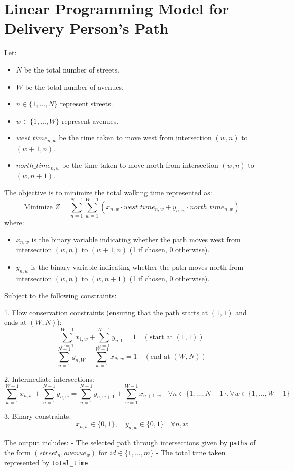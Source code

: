 \documentclass{article}
\begin{document}
\section*{Linear Programming Model for Delivery Person's Path}

Let:
\begin{itemize}
    \item \( N \) be the total number of streets.
    \item \( W \) be the total number of avenues.
    \item \( n \in \{1, \ldots, N\} \) represent streets.
    \item \( w \in \{1, \ldots, W\} \) represent avenues.
    \item \( west\_time_{n,w} \) be the time taken to move west from intersection \((w,n)\) to \((w+1,n)\).
    \item \( north\_time_{n,w} \) be the time taken to move north from intersection \((w,n)\) to \((w,n+1)\).
\end{itemize}

The objective is to minimize the total walking time represented as:
\[
\text{Minimize } Z = \sum_{n=1}^{N-1} \sum_{w=1}^{W-1} (x_{n,w} \cdot west\_time_{n,w} + y_{n,w} \cdot north\_time_{n,w}) 
\]
where:
\begin{itemize}
    \item \( x_{n,w} \) is the binary variable indicating whether the path moves west from intersection \((w,n)\) to \((w+1,n)\) (1 if chosen, 0 otherwise).
    \item \( y_{n,w} \) is the binary variable indicating whether the path moves north from intersection \((w,n)\) to \((w,n+1)\) (1 if chosen, 0 otherwise).
\end{itemize}

Subject to the following constraints:

1. Flow conservation constraints (ensuring that the path starts at \((1,1)\) and ends at \((W,N)\)):
   \[
   \sum_{w=1}^{W-1} x_{1,w} + \sum_{n=1}^{N-1} y_{n,1} = 1 \quad (\text{start at } (1,1))
   \]
   \[
   \sum_{n=1}^{N-1} y_{n,W} + \sum_{w=1}^{W-1} x_{N,w} = 1 \quad (\text{end at } (W,N))
   \]

2. Intermediate intersections:
   \[
   \sum_{w=1}^{W-1} x_{n,w} + \sum_{n=1}^{N-1} y_{n,w} = \sum_{n=1}^{N-1} y_{n,w+1} + \sum_{w=1}^{W-1} x_{n+1,w} \quad \forall n \in \{1, \ldots, N-1\}, \forall w \in \{1, \ldots, W-1\}
   \]

3. Binary constraints:
   \[
   x_{n,w} \in \{0, 1\}, \quad y_{n,w} \in \{0, 1\} \quad \forall n, w
   \]

The output includes:
- The selected path through intersections given by \texttt{paths} of the form \((street_{n}, avenue_{w})\) for \( id \in \{1, \ldots, m\} \)
- The total time taken represented by \texttt{total\_time}
\end{document}
